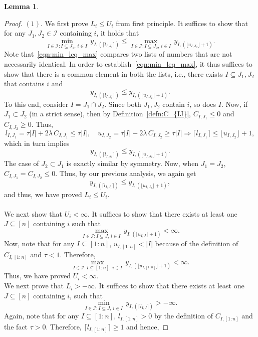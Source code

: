 \documentclass[11pt]{article}
\newcommand{\I}{\mathcal{I}}
\theoremstyle{plain}
\newtheorem{lemma}[theorem]{Lemma}
\theoremstyle{definition}
\theoremstyle{remark}
\begin{document}
\begin{appendix}
\begin{lemma}
    \end{lemma}
\begin{proof}  
  $(1).$ We first prove $L_i\leq U_i$ from first principle. It suffices to show that for any $J_1,J_2 \in \I$ containing $i$, it holds that
  \begin{equation}\label{eqn:min_leq_max}
    \min_{I\in \I: I\subseteq J_1,\, i \in I}\, y_{I,(\lceil l_{I,J_1}\rceil)}\leq \max_{I\in \I: I\subseteq J_2,\, i \in I}\, y_{I,(\lfloor u_{I,J_2}\rfloor+1)}.  
  \end{equation}
  Note that~\eqref{eqn:min_leq_max} compares two lists of numbers that are not necessarily identical. In order to establish~\eqref{eqn:min_leq_max}, it thus suffices to show that there is a common element in both the lists, i.e., there exists $I\subseteq J_1,J_2$ that contains $i$ and
  \[y_{I,(\lceil l_{I,J_1}\rceil)}\leq y_{I,(\lfloor u_{I,J_2}\rfloor+1)}.\]
  To this end, consider $I=J_1\cap J_2.$ Since both $J_1,J_2$ contain $i$, so does $I$. Now, if $J_1\subset J_2$ (in a strict sense), then by Definition~\ref{defn:C_{IJ}}, $C_{I,J_1}\leq 0$ and $C_{I,J_2}\geq 0$. Thus,
  \[l_{I,J_1}=\tau|I|+2\lambda \,C_{I,J_1}\leq \tau |I|,\quad u_{I,J_2}=\tau|I|-2\lambda \,C_{I,J_2}\geq \tau|I|\Rightarrow \lceil l_{I,J_1} \rceil \leq \lfloor u_{I,J_2}\rfloor+1,\]
  which in turn implies 
  \[y_{I,(\lceil l_{I,J_1}\rceil)}\leq y_{I,(\lfloor u_{I,J_2}\rfloor+1)}.\]
  The case of $J_2\subset J_1$ is exactly similar by symmetry. Now, when $J_1=J_2$, $C_{I,J_1}=C_{I,J_2}\leq 0.$ Thus, by our previous analysis, we again get
  \[y_{I,(\lceil l_{I,J_1}\rceil)}\leq y_{I,(\lfloor u_{I,J_2}\rfloor+1)},\]
  and thus, we have proved $L_i\leq U_i$.\\
  \\
  \noindent 
  We next show that $U_i<\infty$.  It suffices to show that there exists at least one $J\subseteq [n]$ containing $i$ such that  \[\max_{I\in \I: I\subseteq J,\, i \in I}\, y_{I,(\lfloor u_{I,J}\rfloor+1)}<\infty.\]
  Now, note that for any $I\subseteq [1:n]$, $u_{I,[1:n]}<|I|$ because of the definition of $C_{I,[1:n]}$ and $\tau<1$. Therefore, 
 \[\max_{I\in \I: I\subseteq [1:n],\, i \in I}\, y_{I,(\lfloor u_{I,[1:n]}\rfloor+1)}<\infty.\]
 Thus, we have proved $U_i<\infty.$
\\
\noindent We next prove that $L_i>-\infty$. It suffices to show that there exists at least one $J\subseteq [n]$ containing $i$, such that
 \[\min_{I\in \I: I\subseteq J,\, i \in I}\, y_{I,(\lceil l_{I,J}\rceil)}>-\infty.\] 
 Again, note that for any $I\subseteq [1:n]$, $l_{I,[1:n]}>0$ by the definition of $C_{I,[1:n]}$ and the fact $\tau>0$. Therefore, $\lceil l_{I,[1:n]}\rceil \geq 1$ and hence,

\end{proof}
\end{appendix}
\end{document}
